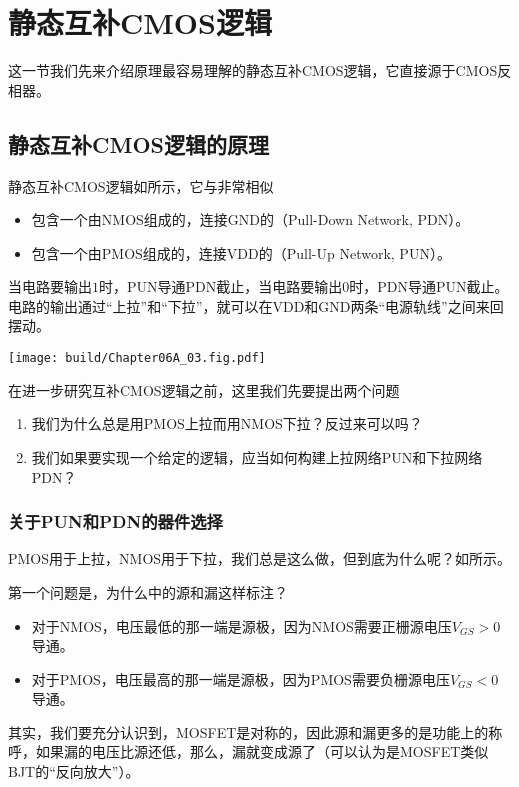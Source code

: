 \section{静态互补CMOS逻辑}
这一节我们先来介绍原理最容易理解的静态互补CMOS逻辑，它直接源于CMOS反相器。

\subsection{静态互补CMOS逻辑的原理}
静态互补CMOS逻辑如所示，它与非常相似
\begin{itemize}
    \item 包含一个由NMOS组成的，连接GND的（Pull-Down Network, PDN）。
    \item 包含一个由PMOS组成的，连接VDD的（Pull-Up Network, PUN）。
\end{itemize}
当电路要输出$1$时，PUN导通PDN截止，当电路要输出$0$时，PDN导通PUN截止。电路的输出通过“上拉”和“下拉”，就可以在VDD和GND两条“电源轨线”之间来回摆动。

\begin{Figure}[静态互补CMOS逻辑]
    \texttt{[image: build/Chapter06A\_03.fig.pdf]}
\end{Figure}


在进一步研究互补CMOS逻辑之前，这里我们先要提出两个问题
\begin{enumerate}
    \item 我们为什么总是用PMOS上拉而用NMOS下拉？反过来可以吗？
    \item 我们如果要实现一个给定的逻辑，应当如何构建上拉网络PUN和下拉网络PDN？
\end{enumerate}

\subsubsection{关于PUN和PDN的器件选择}
PMOS用于上拉，NMOS用于下拉，我们总是这么做，但到底为什么呢？如所示。

第一个问题是，为什么中的源和漏这样标注？
\begin{itemize}
    \item 对于NMOS，电压最低的那一端是源极，因为NMOS需要正栅源电压$V_{GS}>0$导通。
    \item 对于PMOS\hspace{0.1em}，电压最高的那一端是源极，因为PMOS\hspace{0.37em}需要负栅源电压$V_{GS}<0$导通。
\end{itemize}
其实，我们要充分认识到，MOSFET是对称的，因此源和漏更多的是功能上的称呼，如果漏的电压比源还低，那么，漏就变成源了（可以认为是MOSFET类似BJT的“反向放大”）。

